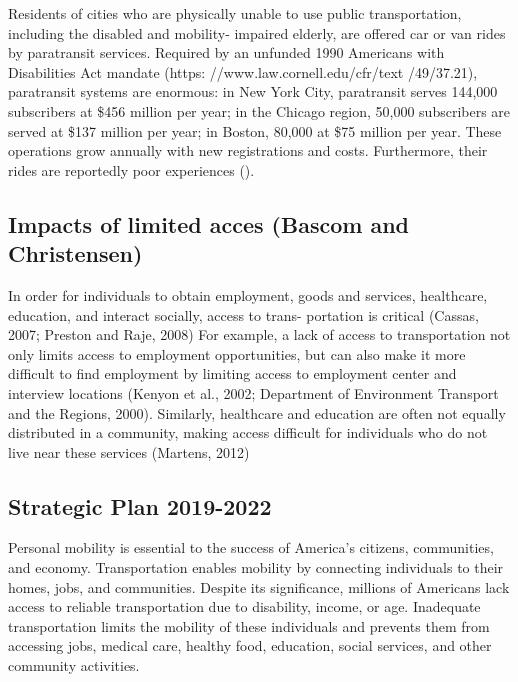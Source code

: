 \documentclass[]{article}
\begin{document}
Residents of cities who are physically unable to use public
transportation, including the disabled and mobility- impaired elderly,
are offered car or van rides by paratransit services. Required by an
unfunded 1990 Americans with Disabilities Act mandate (https:
//www.law.cornell.edu/cfr/text /49/37.21), paratransit systems are
enormous: in New York City, paratransit serves 144,000 subscribers at
\$456 million per year; in the Chicago region, 50,000 subscribers are
served at \$137 million per year; in Boston, 80,000 at \$75 million per
year. These operations grow annually with new registrations and costs.
Furthermore, their rides are reportedly poor experiences ().

\hypertarget{impacts-of-limited-acces-bascom-and-christensen}{%
\subsection{Impacts of limited acces (Bascom and
Christensen)}\label{impacts-of-limited-acces-bascom-and-christensen}}

In order for individuals to obtain employment, goods and services,
healthcare, education, and interact socially, access to trans- portation
is critical (Cassas, 2007; Preston and Raje, 2008) For example, a lack
of access to transportation not only limits access to employment
opportunities, but can also make it more difficult to find employment by
limiting access to employment center and interview locations (Kenyon et
al., 2002; Department of Environment Transport and the Regions, 2000).
Similarly, healthcare and education are often not equally distributed in
a community, making access difficult for individuals who do not live
near these services (Martens, 2012)

\hypertarget{strategic-plan-2019-2022}{%
\subsection{Strategic Plan 2019-2022}\label{strategic-plan-2019-2022}}

Personal mobility is essential to the success of America's citizens,
communities, and economy. Transportation enables mobility by connecting
individuals to their homes, jobs, and communities. Despite its
significance, millions of Americans lack access to reliable
transportation due to disability, income, or age. Inadequate
transportation limits the mobility of these individuals and prevents
them from accessing jobs, medical care, healthy food, education, social
services, and other community activities.
\end{document}
